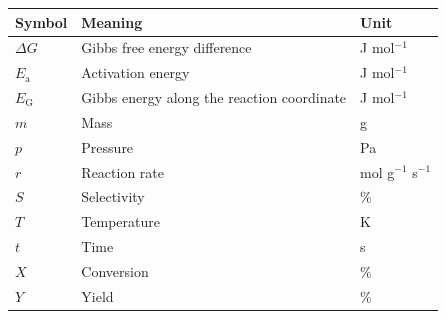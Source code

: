 \renewcommand{\arraystretch}{1.25}
\begin{tabular}{@{}p{}p{}p{}@{}}
    \toprule
    \textbf{Symbol} & \textbf{Meaning} & \textbf{Unit} \\
    \midrule
    $\Delta G$ & Gibbs free energy difference & J mol$^{-1}$ \\
    $E_\mathrm{a}$ & Activation energy & J mol$^{-1}$ \\
    $E_\mathrm{G}$ & Gibbs energy along the reaction coordinate & J mol$^{-1}$ \\    
    $m$ & Mass & g \\
    $p$ & Pressure & Pa \\
    $r$ & Reaction rate & mol g$^{-1}$ s$^{-1}$ \\
    $S$ & Selectivity & \% \\
    $T$ & Temperature & K \\
    $t$ & Time & s \\
    $X$ & Conversion & \% \\
    $Y$ & Yield & \% \\
    \bottomrule
\end{tabular}
\renewcommand{\arraystretch}{1.0}
